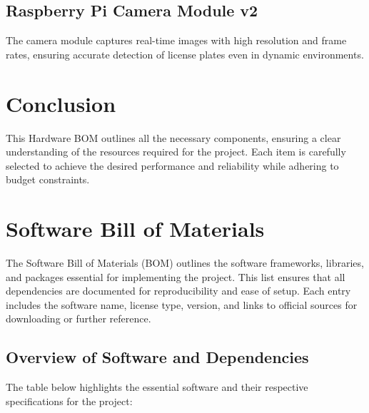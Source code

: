 \subsection{Raspberry Pi Camera Module v2}
The camera module captures real-time images with high resolution and frame rates, ensuring accurate detection of license plates even in dynamic environments.

\section{Conclusion}
This Hardware BOM outlines all the necessary components, ensuring a clear understanding of the resources required for the project. Each item is carefully selected to achieve the desired performance and reliability while adhering to budget constraints.






\section{Software Bill of Materials}

The Software Bill of Materials (BOM) outlines the software frameworks, libraries, and packages essential for implementing the project. This list ensures that all dependencies are documented for reproducibility and ease of setup. Each entry includes the software name, license type, version, and links to official sources for downloading or further reference.

\subsection{Overview of Software and Dependencies}

The table below highlights the essential software and their respective specifications for the project:

